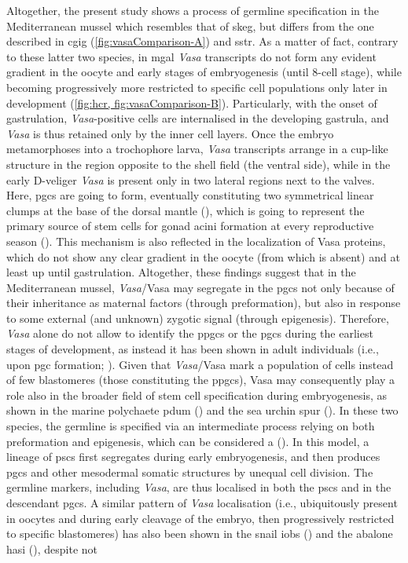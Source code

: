 Altogether, the present study shows a process of germline specification in the Mediterranean mussel which resembles that of \gls{skeg}, but differs from the one described in \gls{cgig} (\cref{fig:vasaComparison-A}) and \gls{sstr}. As a matter of fact, contrary to these latter two species, in \gls{mgal} \textit{Vasa} transcripts do not form any evident gradient in the oocyte and early stages of embryogenesis (until 8-cell stage), while becoming progressively more restricted to specific cell populations only later in development (\cref{fig:hcr, fig:vasaComparison-B}). Particularly, with the onset of gastrulation, \textit{Vasa}-positive cells are internalised in the developing gastrula, and \textit{Vasa} is thus retained only by the inner cell layers. Once the embryo metamorphoses into a trochophore larva, \textit{Vasa} transcripts arrange in a cup-like structure in the region opposite to the shell field (the ventral side), while in the early D-veliger \textit{Vasa} is present only in two lateral regions next to the valves. Here, \glspl{pgc} are going to form, eventually constituting two symmetrical linear clumps at the base of the dorsal mantle (), which is going to represent the primary source of stem cells for gonad acini formation at every reproductive season (). This mechanism is also reflected in the localization of Vasa proteins, which do not show any clear gradient in the oocyte (from which is absent) and at least up until gastrulation. Altogether, these findings suggest that in the Mediterranean mussel, \textit{Vasa}/Vasa may segregate in the \glspl{pgc} not only because of their inheritance as maternal factors (through preformation), but also in response to some external (and unknown) zygotic signal (through epigenesis). Therefore, \textit{Vasa} alone do not allow to identify the \glspl{ppgc} or the \glspl{pgc} during the earliest stages of development, as instead it has been shown in adult individuals (i.e., upon \gls{pgc} formation; ). Given that \textit{Vasa}/Vasa mark a population of cells instead of few blastomeres (those constituting the \glspl{ppgc}), Vasa may consequently play a role also in the broader field of stem cell specification during embryogenesis, as shown in the marine polychaete \gls{pdum} () and the sea urchin \gls{spur} (). In these two species, the germline is specified via an intermediate process relying on both preformation and epigenesis, which can be considered a  (). In this model, a lineage of \glspl{psc} first segregates during early embryogenesis, and then produces \glspl{pgc} and other mesodermal somatic structures by unequal cell division. The germline markers, including \textit{Vasa}, are thus localised in both the \glspl{psc} and in the descendant \glspl{pgc}. A similar pattern of \textit{Vasa} localisation (i.e., ubiquitously present in oocytes and during early cleavage of the embryo, then progressively restricted to specific blastomeres) has also been shown in the snail \gls{iobs} () and the abalone \gls{hasi} (), despite not 